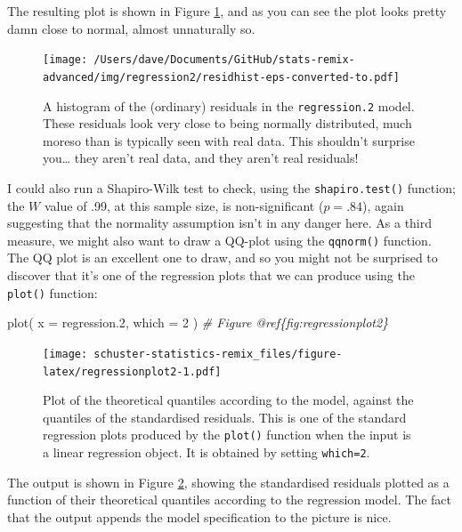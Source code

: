 \documentclass[
]{book}
\newenvironment{Shaded}{\begin{snugshade}}{\end{snugshade}}
\newcommand{\AttributeTok}[1]{\textcolor[rgb]{0.77,0.63,0.00}{#1}}
\newcommand{\CommentTok}[1]{\textcolor[rgb]{0.56,0.35,0.01}{\textit{#1}}}
\newcommand{\DecValTok}[1]{\textcolor[rgb]{0.00,0.00,0.81}{#1}}
\newcommand{\FloatTok}[1]{\textcolor[rgb]{0.00,0.00,0.81}{#1}}
\newcommand{\FunctionTok}[1]{\textcolor[rgb]{0.00,0.00,0.00}{#1}}
\newcommand{\NormalTok}[1]{#1}
\begin{document}
The resulting plot is shown in Figure \ref{fig:residhist}, and as you can see the plot looks pretty damn close to normal, almost unnaturally so.

\begin{figure}
\centering
\texttt{[image: /Users/dave/Documents/GitHub/stats-remix-advanced/img/regression2/residhist-eps-converted-to.pdf]}
\caption{\label{fig:residhist}A histogram of the (ordinary) residuals in the \texttt{regression.2} model. These residuals look very close to being normally distributed, much moreso than is typically seen with real data. This shouldn't surprise you\ldots{} they aren't real data, and they aren't real residuals!}
\end{figure}

I could also run a Shapiro-Wilk test to check, using the \texttt{shapiro.test()} function; the \(W\) value of .99, at this sample size, is non-significant (\(p=.84\)), again suggesting that the normality assumption isn't in any danger here. As a third measure, we might also want to draw a QQ-plot using the \texttt{qqnorm()} function. The QQ plot is an excellent one to draw, and so you might not be surprised to discover that it's one of the regression plots that we can produce using the \texttt{plot()} function:

\begin{Shaded}
\begin{Highlighting}[]
\FunctionTok{plot}\NormalTok{( }\AttributeTok{x =}\NormalTok{ regression}\FloatTok{.2}\NormalTok{, }\AttributeTok{which =} \DecValTok{2}\NormalTok{ )   }\CommentTok{\# Figure @ref\{fig:regressionplot2\}}
\end{Highlighting}
\end{Shaded}

\begin{figure}
\centering
\texttt{[image: schuster-statistics-remix\_files/figure-latex/regressionplot2-1.pdf]}
\caption{\label{fig:regressionplot2}Plot of the theoretical quantiles according to the model, against the quantiles of the standardised residuals. This is one of the standard regression plots produced by the \texttt{plot()} function when the input is a linear regression object. It is obtained by setting \texttt{which=2}.}
\end{figure}

The output is shown in Figure \ref{fig:regressionplot2}, showing the standardised residuals plotted as a function of their theoretical quantiles according to the regression model. The fact that the output appends the model specification to the picture is nice.
\end{document}

